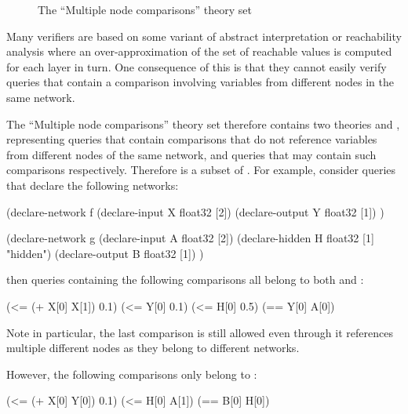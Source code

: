 \begin{figure}[h]
\centering
{}
\caption{The ``Multiple node comparisons'' theory set}
\label{fig:multi-node-comparisons-theory-set}
\end{figure}

Many verifiers are based on some variant of abstract interpretation or reachability analysis where an over-approximation of the set of reachable values is computed for each layer in turn.
One consequence of this is that they cannot easily verify queries that contain a comparison involving variables from different nodes in the same network.

The ``Multiple node comparisons'' theory set therefore contains two theories \snc{} and \mnc{}, representing queries that contain comparisons that do not reference variables from different nodes of the same network, and queries that may contain such comparisons respectively. Therefore \snc{} is a subset of \mnc{}. For example, consider queries that declare the following networks:

\begin{code}[style=lbnf]
(declare-network f
    (declare-input  X float32 [2])
    (declare-output Y float32 [1])
)

(declare-network g
    (declare-input  A float32 [2])
    (declare-hidden H float32 [1] "hidden")
    (declare-output B float32 [1])
)
\end{code}

\noindent then queries containing the following comparisons all belong to both \snc{} and \mnc{}:

\begin{code}[style=lbnf]
(<= (+ X[0] X[1]) 0.1)
(<= Y[0] 0.1)
(<= H[0] 0.5)
(== Y[0] A[0])
\end{code}

\noindent Note in particular, the last comparison is still allowed even through it references multiple different nodes as they belong to different networks. 

However, the following comparisons only belong to \mnc{}:

\begin{code}[style=lbnf]
(<= (+ X[0] Y[0]) 0.1)
(<= H[0] A[1])
(== B[0] H[0])
\end{code}

